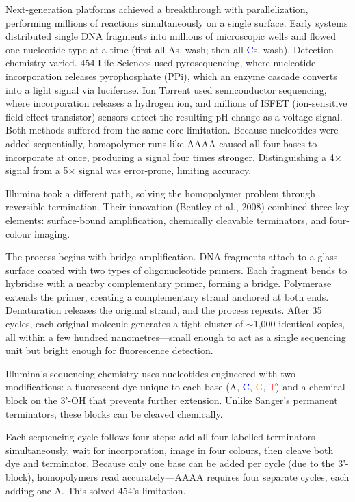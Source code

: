 Next-generation platforms achieved a breakthrough with parallelization, performing millions of reactions simultaneously on a single surface. Early systems distributed single DNA fragments into millions of microscopic wells and flowed one nucleotide type at a time (first all \textcolor{green!60!black}{A}s, wash; then all \textcolor{blue}{C}s, wash). Detection chemistry varied. 454 Life Sciences used pyrosequencing, where nucleotide incorporation releases pyrophosphate (PPi), which an enzyme cascade converts into a light signal via luciferase. Ion Torrent used semiconductor sequencing, where incorporation releases a hydrogen ion, and millions of ISFET (ion-sensitive field-effect transistor) sensors detect the resulting pH change as a voltage signal. Both methods suffered from the same core limitation. Because nucleotides were added sequentially, homopolymer runs like \textcolor{green!60!black}{A}\textcolor{green!60!black}{A}\textcolor{green!60!black}{A}\textcolor{green!60!black}{A} caused all four bases to incorporate at once, producing a signal four times stronger. Distinguishing a 4× signal from a 5× signal was error-prone, limiting accuracy.

Illumina took a different path, solving the homopolymer problem through reversible termination. Their innovation (Bentley et al., 2008) combined three key elements: surface-bound amplification, chemically cleavable terminators, and four-colour imaging.

The process begins with bridge amplification. DNA fragments attach to a glass surface coated with two types of oligonucleotide primers. Each fragment bends to hybridise with a nearby complementary primer, forming a bridge. Polymerase extends the primer, creating a complementary strand anchored at both ends. Denaturation releases the original strand, and the process repeats. After 35 cycles, each original molecule generates a tight cluster of ${\sim}$1,000 identical copies, all within a few hundred nanometres—small enough to act as a single sequencing unit but bright enough for fluorescence detection.

Illumina's sequencing chemistry uses nucleotides engineered with two modifications: a fluorescent dye unique to each base (\textcolor{green!60!black}{A}, \textcolor{blue}{C}, \textcolor{orange}{G}, \textcolor{red}{T}) and a chemical block on the 3'-OH that prevents further extension. Unlike Sanger's permanent terminators, these blocks can be cleaved chemically.

Each sequencing cycle follows four steps: add all four labelled terminators simultaneously, wait for incorporation, image in four colours, then cleave both dye and terminator. Because only one base can be added per cycle (due to the 3'-block), homopolymers read accurately—\textcolor{green!60!black}{A}\textcolor{green!60!black}{A}\textcolor{green!60!black}{A}\textcolor{green!60!black}{A} requires four separate cycles, each adding one \textcolor{green!60!black}{A}. This solved 454's limitation.

